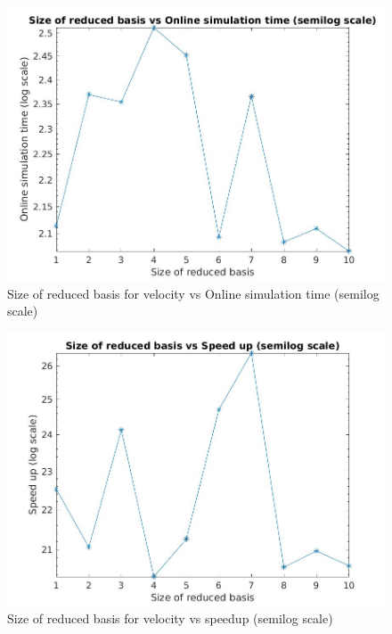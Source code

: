 \documentclass[a4paper,oneside,openright,spanish,english]{book}
\begin{document}
\begin{figure}
  \includegraphics[width=\linewidth]{same_train_test/size_vs_online_simulation_time_semilog.jpg}
  \caption{Size of reduced basis for velocity vs Online simulation time (semilog scale)} 
\label{online_simulation_time_2}
\end{figure}

\begin{figure}
  \includegraphics[width=\linewidth]{same_train_test/size_vs_reduced_basis_semilog.jpg}
  \caption{Size of reduced basis for velocity vs speedup (semilog scale)} 
\label{speedup_2}
\end{figure}
\end{document}
